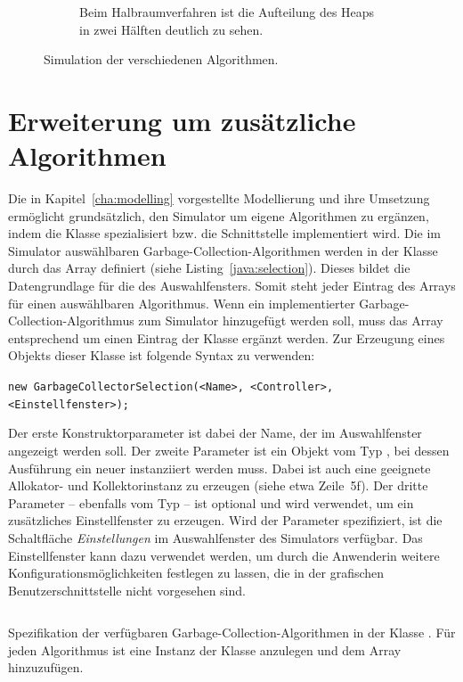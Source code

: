 \begin{figure}[p]
\begin{subfigure}{\textwidth}
		\caption{Beim Halbraumverfahren ist die Aufteilung des Heaps in zwei Hälften deutlich zu sehen.}
	\end{subfigure}
	\caption[Simulation der verschiedenen Algorithmen]{Simulation der verschiedenen Algorithmen.}
	\label{fig:simulation}
\end{figure}

\section{Erweiterung um zusätzliche Algorithmen}
\label{sec:extension}
Die in Kapitel~\ref{cha:modelling} vorgestellte Modellierung und ihre Umsetzung ermöglicht grundsätzlich, den Simulator um eigene Algorithmen zu ergänzen, indem die Klasse  spezialisiert bzw. die Schnittstelle  implementiert wird.
Die im Simulator auswählbaren Garbage-Collection-Algorithmen werden in der Klasse  durch das Array  definiert (siehe Listing~\ref{java:selection}).
Dieses bildet die Datengrundlage für die  des Auswahlfensters.
Somit steht jeder Eintrag des Arrays für einen auswählbaren Algorithmus.
Wenn ein implementierter Garbage-Collection-Algorithmus zum Simulator hinzugefügt werden soll, muss das Array entsprechend um einen Eintrag der Klasse  ergänzt werden.
Zur Erzeugung eines Objekts dieser Klasse ist folgende Syntax zu verwenden:

\vspace*{-0.5cm}
\begin{center}
	\texttt{new GarbageCollectorSelection(<Name>, <Controller>, <Einstellfenster>);}
\end{center}

\vspace*{-0.5cm}
Der erste Konstruktorparameter ist dabei der Name, der im Auswahlfenster angezeigt werden soll.
Der zweite Parameter ist ein Objekt vom Typ , bei dessen Ausführung ein neuer  instanziiert werden muss.
Dabei ist auch eine geeignete Allokator- und Kollektorinstanz zu erzeugen (siehe etwa Zeile~5f).
Der dritte Parameter -- ebenfalls vom Typ  -- ist optional und wird verwendet, um ein zusätzliches Einstellfenster zu erzeugen.
Wird der Parameter spezifiziert, ist die Schaltfläche \textit{Einstellungen} im Auswahlfenster des Simulators verfügbar.
Das Einstellfenster kann dazu verwendet werden, um durch die Anwenderin weitere Konfigurationsmöglichkeiten festlegen zu lassen, die in der grafischen Benutzerschnittstelle nicht vorgesehen sind.

\begin{listing}[h]
	\inputminted[]{java}{code/CollectorSelection.java}
	\caption[Spezifikation der verfügbaren Algorithmen]{Spezifikation der verfügbaren Garbage-Collection-Algorithmen in der Klasse . Für jeden Algorithmus ist eine Instanz der Klasse  anzulegen und dem Array  hinzuzufügen.}
	\label{java:selection}
\end{listing}